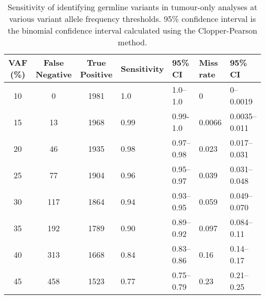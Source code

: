 \documentclass{bmcart}
\begin{document}
\begin{backmatter}

\begin{table}[H]
\caption[Sensitivity of identifying germline variants in tumour-only analyses at various variant allele frequency thresholds.]{Sensitivity of identifying germline variants in tumour-only analyses at various variant allele frequency thresholds. 95\% confidence interval is the binomial confidence interval calculated using the Clopper-Pearson method.}
\label{sensitivity}
\centering
      \begin{tabular}{ccc|ll|ll}
        \hline
        VAF (\%) & False Negative & True Positive & Sensitivity & 95\% CI & Miss rate & 95\% CI
        \\
        \hline
        10 & 0 & 1981 & 1.0 & 1.0--1.0 & 0 & 0--0.0019
        \\
        15 & 13 & 1968 & 0.99 & 0.99-1.0 & 0.0066 & 0.0035--0.011
        \\
        20 & 46 & 1935 & 0.98 & 0.97--0.98 & 0.023 & 0.017--0.031
        \\
        25 & 77 & 1904 & 0.96 & 0.95--0.97 & 0.039 & 0.031--0.048
        \\
        30 & 117 & 1864 & 0.94 & 0.93--0.95 & 0.059 & 0.049--0.070
        \\
        35 & 192 & 1789 & 0.90 & 0.89--0.92 & 0.097 & 0.084--0.11
        \\
        40 & 313 & 1668 & 0.84 & 0.83--0.86 & 0.16 & 0.14--0.17
        \\
        45 & 458 & 1523 & 0.77 & 0.75--0.79 & 0.23 & 0.21--0.25
        \\
				\hline
      \end{tabular} \\
\end{table}



\end{backmatter}
\end{document}
